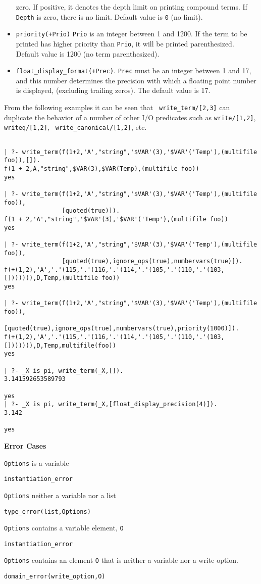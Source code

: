 \begin{description}
\begin{itemize}
zero. If positive, it denotes the depth limit on printing compound
terms. If {\tt Depth} is zero, there is no limit. Default value is
{\tt 0} (no limit).
%
\item {\tt priority(+Prio)} {\tt Prio} is an integer between 1 and
1200.  If the term to be printed has higher priority than {\tt Prio},
it will be printed parenthesized.  Default value is 1200 (no term
parenthesized).
%
\item {\tt float\_display\_format(+Prec)}.  {\tt Prec} must be an
  integer between 1 and 17, and this number determines the precision
  with which a floating point number is displayed, (excluding trailing
  zeros).  The default value is 17.
\end{itemize}

From the following examples it can be seen that {\tt
write\_term/[2,3]} can duplicate the behavior of a number of other
I/O predicates such as {\tt write/[1,2]}, {\tt writeq/[1,2]}, {\tt
write\_canonical/[1,2]}, etc.
{\small
\begin{verbatim}

| ?- write_term(f(1+2,'A',"string",'$VAR'(3),'$VAR'('Temp'),(multifile foo)),[]).
f(1 + 2,A,"string",$VAR(3),$VAR(Temp),(multifile foo))
yes

| ?- write_term(f(1+2,'A',"string",'$VAR'(3),'$VAR'('Temp'),(multifile foo)),
                [quoted(true)]).
f(1 + 2,'A',"string",'$VAR'(3),'$VAR'('Temp'),(multifile foo))
yes

| ?- write_term(f(1+2,'A',"string",'$VAR'(3),'$VAR'('Temp'),(multifile foo)),
                [quoted(true),ignore_ops(true),numbervars(true)]).
f(+(1,2),'A','.'(115,'.'(116,'.'(114,'.'(105,'.'(110,'.'(103,[])))))),D,Temp,(multifile foo))
yes

| ?- write_term(f(1+2,'A',"string",'$VAR'(3),'$VAR'('Temp'),(multifile foo)),
                [quoted(true),ignore_ops(true),numbervars(true),priority(1000)]).
f(+(1,2),'A','.'(115,'.'(116,'.'(114,'.'(105,'.'(110,'.'(103,[])))))),D,Temp,multifile(foo))
yes

| ?- _X is pi, write_term(_X,[]).
3.141592653589793

yes
| ?- _X is pi, write_term(_X,[float_display_precision(4)]).
3.142

yes
\end{verbatim}
}

{\bf Error Cases} 
\bi
\item 	{\tt Options} is a variable
\bi
\item    {\tt instantiation\_error}
\ei
\item 	{\tt Options} neither a variable nor a list
\bi
\item    {\tt type\_error(list,Options)}
\ei
\item 	{\tt Options} contains a variable element, {\tt O}
\bi
\item    {\tt instantiation\_error}
\ei
\item 	{\tt Options} contains an element {\tt O} that is neither a variable
nor a write option.
\bi
\item    {\tt domain\_error(write\_option,O)}
\ei
\ei


\end{description}
